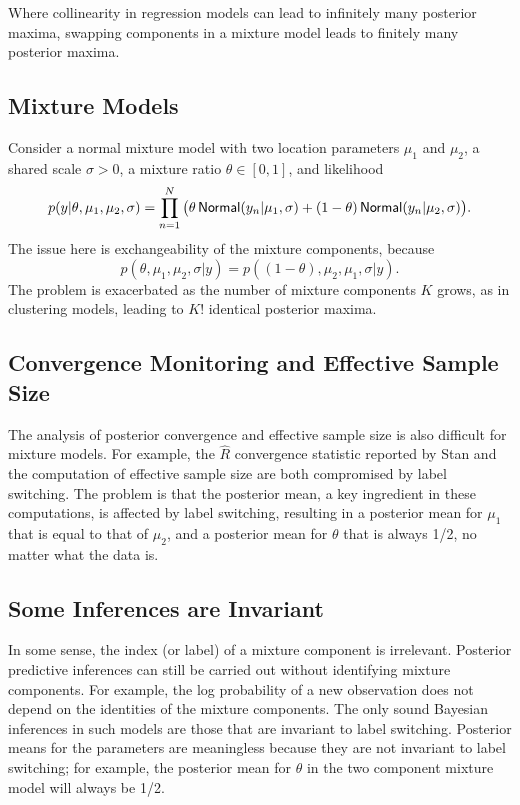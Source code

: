 Where collinearity in regression models can lead to infinitely many
posterior maxima, swapping components in a mixture model leads to
finitely many posterior maxima.

\subsection{Mixture Models}

Consider a normal mixture model with two location parameters $\mu_1$
and $\mu_2$, a shared scale $\sigma > 0$, a mixture ratio $\theta \in
[0,1]$, and likelihood
\[
p(y|\theta,\mu_1,\mu_2,\sigma)
= \prod_{n=1}^N \big( \theta \, \mbox{\sf Normal}(y_n|\mu_1,\sigma)
                       + (1 - \theta) \, \mbox{\sf Normal}(y_n|\mu_2,\sigma) \big).
\]
The issue here is exchangeability of the mixture components, because
\[
p(\theta,\mu_1,\mu_2,\sigma|y) = p((1-\theta),\mu_2,\mu_1,\sigma|y).
\]
The problem is exacerbated as the number of mixture components $K$
grows, as in clustering models, leading to $K!$ identical posterior
maxima.

\subsection{Convergence Monitoring and Effective Sample Size}

The analysis of posterior convergence and effective sample size is
also difficult for mixture models.  For example, the $\hat{R}$
convergence statistic reported by Stan and the computation of
effective sample size are both compromised by label switching.  The
problem is that the posterior mean, a key ingredient in these
computations, is affected by label switching, resulting in a posterior
mean for $\mu_1$ that is equal to that of $\mu_2$, and a posterior
mean for $\theta$ that is always 1/2, no matter what the data is.

\subsection{Some Inferences are Invariant}

In some sense, the index (or label) of a mixture component is
irrelevant.  Posterior predictive inferences can still be carried out
without identifying mixture components.  For example, the log
probability of a new observation does not depend on the identities of
the mixture components.  The only sound Bayesian inferences in such
models are those that are invariant to label switching.  Posterior
means for the parameters are meaningless because they are not
invariant to label switching; for example, the posterior mean for
$\theta$ in the two component mixture model will always be 1/2.

